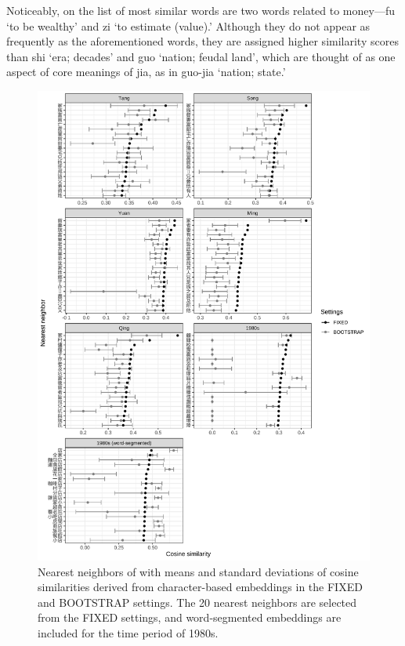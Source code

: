 Noticeably, on the list of most similar words are two words related to money—fu `to be wealthy' and zi `to estimate (value).' Although they do not appear as frequently as the aforementioned words, they are assigned higher similarity scores than shi `era; decades' and guo `nation; feudal land', which are thought of as one aspect of core meanings of jia, as in guo-jia `nation; state.'

\newpage
\begin{figure}[H]
  \centering
  \includegraphics[height=0.85\textheight,keepaspectratio]{figures_new/bootstrap_for_stability/neighbor_mean_and_sd_grey.pdf}
  \caption{Nearest neighbors of \jia with means and standard deviations of cosine similarities derived from character-based embeddings in the FIXED and BOOTSTRAP settings. The 20 nearest neighbors are selected from the FIXED settings, and word-segmented embeddings are included for the time period of 1980s.}
\end{figure}

